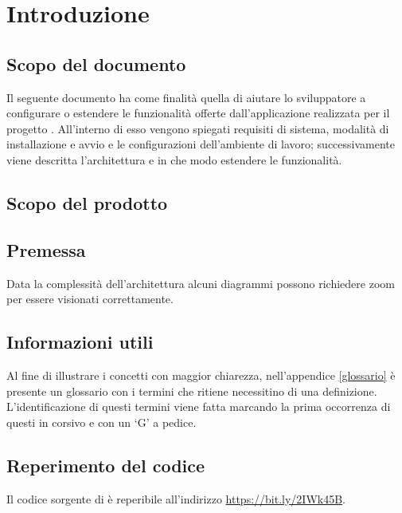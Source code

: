 \section{Introduzione} \label{introduzione}

    \subsection{Scopo del documento}

        Il seguente documento ha come finalità quella di aiutare lo sviluppatore a configurare o estendere le funzionalità
        offerte dall'applicazione realizzata per il progetto \ProjectName{}.
        All'interno di esso vengono spiegati requisiti di sistema, modalità di installazione e avvio e le configurazioni
        dell'ambiente di lavoro; successivamente viene descritta l'architettura e in che modo estendere le funzionalità.

    \subsection{Scopo del prodotto}

        \ScopoProdotto{}

    \subsection{Premessa} \label{premessa}

        Data la complessità dell'architettura alcuni diagrammi possono richiedere zoom per essere visionati correttamente.

    \subsection{Informazioni utili}
		
		Al fine di illustrare i concetti con maggior chiarezza, nell'appendice \ref{glossario} è presente un glossario
		con i termini che \GroupName{} ritiene necessitino di una definizione. L'identificazione di questi termini
		viene fatta marcando la prima occorrenza di questi in corsivo e con un `G' a pedice.

    \subsection{Reperimento del codice} \label{reperimentocodice}

    	Il codice sorgente di \ProjectName{} è reperibile all'indirizzo \url{https://bit.ly/2IWk45B}.
